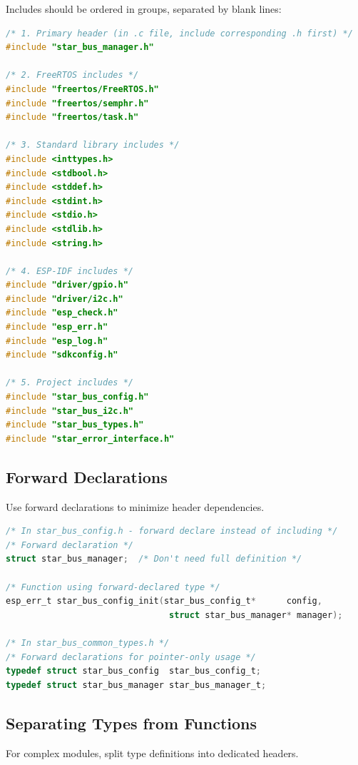 Includes should be ordered in groups, separated by blank lines:

\begin{lstlisting}[language=C]
/* 1. Primary header (in .c file, include corresponding .h first) */
#include "star_bus_manager.h"

/* 2. FreeRTOS includes */
#include "freertos/FreeRTOS.h"
#include "freertos/semphr.h"
#include "freertos/task.h"

/* 3. Standard library includes */
#include <inttypes.h>
#include <stdbool.h>
#include <stddef.h>
#include <stdint.h>
#include <stdio.h>
#include <stdlib.h>
#include <string.h>

/* 4. ESP-IDF includes */
#include "driver/gpio.h"
#include "driver/i2c.h"
#include "esp_check.h"
#include "esp_err.h"
#include "esp_log.h"
#include "sdkconfig.h"

/* 5. Project includes */
#include "star_bus_config.h"
#include "star_bus_i2c.h"
#include "star_bus_types.h"
#include "star_error_interface.h"
\end{lstlisting}

\subsection{Forward Declarations}

Use forward declarations to minimize header dependencies.

\begin{lstlisting}[language=C]
/* In star_bus_config.h - forward declare instead of including */
/* Forward declaration */
struct star_bus_manager;  /* Don't need full definition */

/* Function using forward-declared type */
esp_err_t star_bus_config_init(star_bus_config_t*      config,
                                struct star_bus_manager* manager);

/* In star_bus_common_types.h */
/* Forward declarations for pointer-only usage */
typedef struct star_bus_config  star_bus_config_t;
typedef struct star_bus_manager star_bus_manager_t;
\end{lstlisting}

\subsection{Separating Types from Functions}

For complex modules, split type definitions into dedicated headers.

